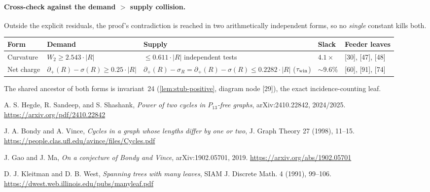 \documentclass[11pt]{article}
\newcommand{\defp}{\partial_+}
\begin{document}
\paragraph{Cross-check against the demand $>$ supply collision.}
Outside the explicit residuals, the proof's contradiction is reached in two
arithmetically independent forms, so no \emph{single} constant kills both.

\begin{center}\small
\begin{tabular}{L{0.12\textwidth} L{0.23\textwidth} L{0.27\textwidth} L{0.07\textwidth} L{0.15\textwidth}}
\toprule
\textbf{Form} & \textbf{Demand} & \textbf{Supply} & \textbf{Slack} & \textbf{Feeder leaves} \\
\midrule
Curvature & $W_2\ge2.543\cdot|R|$ & $\le0.611\cdot|R|$ independent tests & $4.1\times$ & {[30]}, {[47]}, {[48]} \\
Net charge & $\defp(R)-\sigma(R)\ge0.25\cdot|R|$ & $\defp(R)-\sigma_R=\defp(R)-\sigma(R)\le0.2282\cdot|R|$ ($\tau_{\rm win}$) & $\sim9.6\%$ & {[60]}, {[91]}, {[74]} \\
\bottomrule
\end{tabular}
\end{center}
\noindent The shared ancestor of both forms is invariant~24 (\cref{lem:stub-positive}, diagram node {[29]}), the exact incidence-counting leaf.

\begin{thebibliography}{9}

A. S. Hegde, R. Sandeep, and S. Shashank,
\emph{Power of two cycles in $P_{13}$-free graphs},
arXiv:2410.22842, 2024/2025.
\url{https://arxiv.org/pdf/2410.22842}

J. A. Bondy and A. Vince,
\emph{Cycles in a graph whose lengths differ by one or two},
J. Graph Theory 27 (1998), 11--15.
\url{https://people.clas.ufl.edu/avince/files/Cycles.pdf}

J. Gao and J. Ma,
\emph{On a conjecture of Bondy and Vince},
arXiv:1902.05701, 2019.
\url{https://arxiv.org/abs/1902.05701}

D. J. Kleitman and D. B. West,
\emph{Spanning trees with many leaves},
SIAM J. Discrete Math. 4 (1991), 99--106.
\url{https://dwest.web.illinois.edu/pubs/manyleaf.pdf}

\end{thebibliography}
\end{document}
